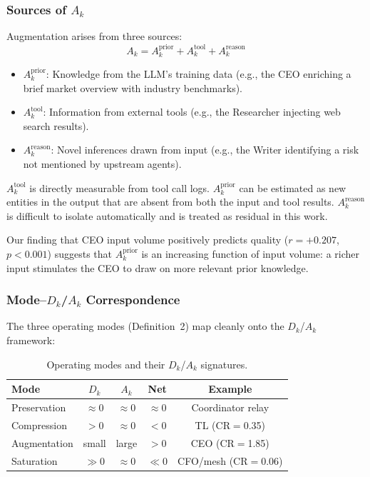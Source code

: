 \documentclass[conference]{IEEEtran}
\begin{document}
\subsubsection{Sources of $A_k$}

Augmentation arises from three sources:
\begin{equation}
    A_k = A_k^{\text{prior}} + A_k^{\text{tool}} + A_k^{\text{reason}}
\end{equation}

\begin{itemize}
    \item $A_k^{\text{prior}}$: Knowledge from the LLM's training data (e.g., the CEO enriching a brief market overview with industry benchmarks).
    \item $A_k^{\text{tool}}$: Information from external tools (e.g., the Researcher injecting web search results).
    \item $A_k^{\text{reason}}$: Novel inferences drawn from input (e.g., the Writer identifying a risk not mentioned by upstream agents).
\end{itemize}

$A_k^{\text{tool}}$ is directly measurable from tool call logs.
$A_k^{\text{prior}}$ can be estimated as new entities in the output that are absent from both the input and tool results.
$A_k^{\text{reason}}$ is difficult to isolate automatically and is treated as residual in this work.

Our finding that CEO input volume positively predicts quality ($r = +0.207$, $p < 0.001$) suggests that $A_k^{\text{prior}}$ is an increasing function of input volume: a richer input stimulates the CEO to draw on more relevant prior knowledge.

\subsubsection{Mode--$D_k$/$A_k$ Correspondence}

The three operating modes (Definition~2) map cleanly onto the $D_k$/$A_k$ framework:

\begin{table}[t]
\centering
\caption{Operating modes and their $D_k$/$A_k$ signatures.}
\label{tab:mode_dk_ak}
\small
\begin{tabular}{lcccc}
\toprule
\textbf{Mode} & $D_k$ & $A_k$ & \textbf{Net} & \textbf{Example} \\
\midrule
Preservation & $\approx 0$ & $\approx 0$ & $\approx 0$ & Coordinator relay \\
Compression  & $> 0$       & $\approx 0$ & $< 0$       & TL (CR$=$0.35) \\
Augmentation & small       & large       & $> 0$       & CEO (CR$=$1.85) \\
Saturation   & $\gg 0$     & $\approx 0$ & $\ll 0$     & CFO/mesh (CR$=$0.06) \\
\bottomrule
\end{tabular}
\end{table}
\end{document}
